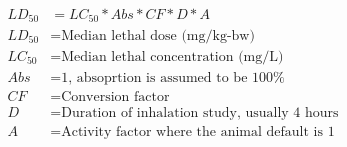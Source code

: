 \documentclass[fleqn, oneside, 11pt]{article}%
\begin{document}
\begin{preview}
\begin{align*}%
LD_{50} & = LC_{50}*Abs*CF*D*A\nonumber \\
LD_{50} & =  \text{Median lethal dose (mg/kg-bw)} \nonumber \\
LC_{50} & =  \text{Median lethal concentration (mg/L)} \nonumber \\
Abs & =  \text{1, absoprtion is assumed to be 100\%} \nonumber \\
CF & =  \text{Conversion factor} \nonumber \\
D & =  \text{Duration of inhalation study, usually 4 hours} \nonumber \\
A & =  \text{Activity factor where the animal default is 1} \nonumber \\
\end{align*} 
\end{preview}
\end{document}
